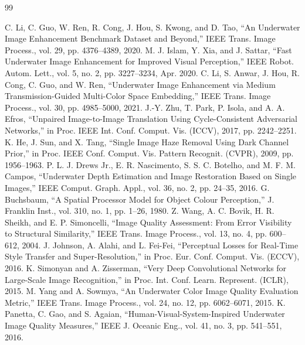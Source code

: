 \documentclass[a4paper,zihao=-4,linespread=1.25]{ctexart}
\begin{document}
\newpage
\begin{thebibliography}{99}

 C. Li, C. Guo, W. Ren, R. Cong, J. Hou, S. Kwong, and D. Tao, “An Underwater Image Enhancement Benchmark Dataset and Beyond,” IEEE Trans. Image Process., vol. 29, pp. 4376–4389, 2020.
 M. J. Islam, Y. Xia, and J. Sattar, “Fast Underwater Image Enhancement for Improved Visual Perception,” IEEE Robot. Autom. Lett., vol. 5, no. 2, pp. 3227–3234, Apr. 2020.
 C. Li, S. Anwar, J. Hou, R. Cong, C. Guo, and W. Ren, “Underwater Image Enhancement via Medium Transmission-Guided Multi-Color Space Embedding,” IEEE Trans. Image Process., vol. 30, pp. 4985–5000, 2021.
 J.-Y. Zhu, T. Park, P. Isola, and A. A. Efros, “Unpaired Image-to-Image Translation Using Cycle-Consistent Adversarial Networks,” in Proc. IEEE Int. Conf. Comput. Vis. (ICCV), 2017, pp. 2242–2251.
 K. He, J. Sun, and X. Tang, “Single Image Haze Removal Using Dark Channel Prior,” in Proc. IEEE Conf. Comput. Vis. Pattern Recognit. (CVPR), 2009, pp. 1956–1963.
 P. L. J. Drews Jr., E. R. Nascimento, S. S. C. Botelho, and M. F. M. Campos, “Underwater Depth Estimation and Image Restoration Based on Single Images,” IEEE Comput. Graph. Appl., vol. 36, no. 2, pp. 24–35, 2016.
 G. Buchsbaum, “A Spatial Processor Model for Object Colour Perception,” J. Franklin Inst., vol. 310, no. 1, pp. 1–26, 1980.
 Z. Wang, A. C. Bovik, H. R. Sheikh, and E. P. Simoncelli, “Image Quality Assessment: From Error Visibility to Structural Similarity,” IEEE Trans. Image Process., vol. 13, no. 4, pp. 600–612, 2004.
 J. Johnson, A. Alahi, and L. Fei-Fei, “Perceptual Losses for Real-Time Style Transfer and Super-Resolution,” in Proc. Eur. Conf. Comput. Vis. (ECCV), 2016.
 K. Simonyan and A. Zisserman, “Very Deep Convolutional Networks for Large-Scale Image Recognition,” in Proc. Int. Conf. Learn. Represent. (ICLR), 2015.
 M. Yang and A. Sowmya, “An Underwater Color Image Quality Evaluation Metric,” IEEE Trans. Image Process., vol. 24, no. 12, pp. 6062–6071, 2015.
 K. Panetta, C. Gao, and S. Agaian, “Human-Visual-System-Inspired Underwater Image Quality Measures,” IEEE J. Oceanic Eng., vol. 41, no. 3, pp. 541–551, 2016.

\end{thebibliography}
\end{document}
